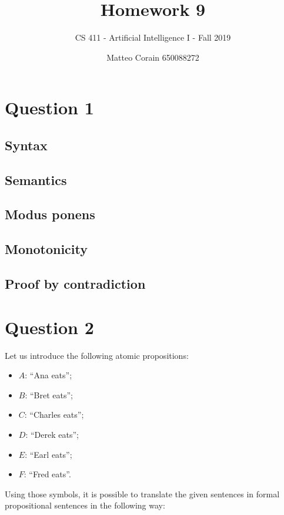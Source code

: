 \documentclass[letterpaper,headings=standardclasses]{scrartcl}
\title{Homework 9}
\subtitle{CS 411 - Artificial Intelligence I - Fall 2019}
\author{Matteo Corain 650088272}
\begin{document}
\maketitle

\section{Question 1}

\subsection{Syntax}

\subsection{Semantics}

\subsection{Modus ponens}

\subsection{Monotonicity}

\subsection{Proof by contradiction}

\section{Question 2}

Let us introduce the following atomic propositions:

\begin{itemize}
    \item $A$: ``Ana eats'';
    \item $B$: ``Bret eats'';
    \item $C$: ``Charles eats'';
    \item $D$: ``Derek eats'';
    \item $E$: ``Earl eats'';
    \item $F$: ``Fred eats''.
\end{itemize}

Using those symbols, it is possible to translate the given sentences in formal propositional sentences in the following way:
\end{document}
